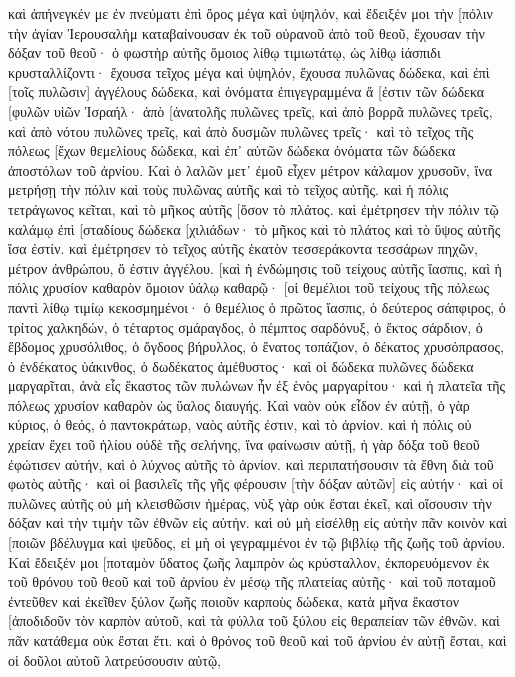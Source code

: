 καὶ ἀπήνεγκέν με ἐν πνεύματι ἐπὶ ὄρος μέγα καὶ ὑψηλόν, καὶ ἔδειξέν μοι τὴν [πόλιν τὴν ἁγίαν Ἰερουσαλὴμ καταβαίνουσαν ἐκ τοῦ οὐρανοῦ ἀπὸ τοῦ θεοῦ, 
ἔχουσαν τὴν δόξαν τοῦ θεοῦ· ὁ φωστὴρ αὐτῆς ὅμοιος λίθῳ τιμιωτάτῳ, ὡς λίθῳ ἰάσπιδι κρυσταλλίζοντι· 
ἔχουσα τεῖχος μέγα καὶ ὑψηλόν, ἔχουσα πυλῶνας δώδεκα, καὶ ἐπὶ [τοῖς πυλῶσιν] ἀγγέλους δώδεκα, καὶ ὀνόματα ἐπιγεγραμμένα ἅ [ἐστιν τῶν δώδεκα [φυλῶν υἱῶν Ἰσραήλ· 
ἀπὸ [ἀνατολῆς πυλῶνες τρεῖς, καὶ ἀπὸ βορρᾶ πυλῶνες τρεῖς, καὶ ἀπὸ νότου πυλῶνες τρεῖς, καὶ ἀπὸ δυσμῶν πυλῶνες τρεῖς· 
καὶ τὸ τεῖχος τῆς πόλεως [ἔχων θεμελίους δώδεκα, καὶ ἐπ᾽ αὐτῶν δώδεκα ὀνόματα τῶν δώδεκα ἀποστόλων τοῦ ἀρνίου. 
Καὶ ὁ λαλῶν μετ᾽ ἐμοῦ εἶχεν μέτρον κάλαμον χρυσοῦν, ἵνα μετρήσῃ τὴν πόλιν καὶ τοὺς πυλῶνας αὐτῆς καὶ τὸ τεῖχος αὐτῆς. 
καὶ ἡ πόλις τετράγωνος κεῖται, καὶ τὸ μῆκος αὐτῆς [ὅσον τὸ πλάτος. καὶ ἐμέτρησεν τὴν πόλιν τῷ καλάμῳ ἐπὶ [σταδίους δώδεκα [χιλιάδων· τὸ μῆκος καὶ τὸ πλάτος καὶ τὸ ὕψος αὐτῆς ἴσα ἐστίν. 
καὶ ἐμέτρησεν τὸ τεῖχος αὐτῆς ἑκατὸν τεσσεράκοντα τεσσάρων πηχῶν, μέτρον ἀνθρώπου, ὅ ἐστιν ἀγγέλου. 
[καὶ ἡ ἐνδώμησις τοῦ τείχους αὐτῆς ἴασπις, καὶ ἡ πόλις χρυσίον καθαρὸν ὅμοιον ὑάλῳ καθαρῷ· 
[οἱ θεμέλιοι τοῦ τείχους τῆς πόλεως παντὶ λίθῳ τιμίῳ κεκοσμημένοι· ὁ θεμέλιος ὁ πρῶτος ἴασπις, ὁ δεύτερος σάπφιρος, ὁ τρίτος χαλκηδών, ὁ τέταρτος σμάραγδος, 
ὁ πέμπτος σαρδόνυξ, ὁ ἕκτος σάρδιον, ὁ ἕβδομος χρυσόλιθος, ὁ ὄγδοος βήρυλλος, ὁ ἔνατος τοπάζιον, ὁ δέκατος χρυσόπρασος, ὁ ἑνδέκατος ὑάκινθος, ὁ δωδέκατος ἀμέθυστος· 
καὶ οἱ δώδεκα πυλῶνες δώδεκα μαργαρῖται, ἀνὰ εἷς ἕκαστος τῶν πυλώνων ἦν ἐξ ἑνὸς μαργαρίτου· καὶ ἡ πλατεῖα τῆς πόλεως χρυσίον καθαρὸν ὡς ὕαλος διαυγής. 
Καὶ ναὸν οὐκ εἶδον ἐν αὐτῇ, ὁ γὰρ κύριος, ὁ θεός, ὁ παντοκράτωρ, ναὸς αὐτῆς ἐστιν, καὶ τὸ ἀρνίον. 
καὶ ἡ πόλις οὐ χρείαν ἔχει τοῦ ἡλίου οὐδὲ τῆς σελήνης, ἵνα φαίνωσιν αὐτῇ, ἡ γὰρ δόξα τοῦ θεοῦ ἐφώτισεν αὐτήν, καὶ ὁ λύχνος αὐτῆς τὸ ἀρνίον. 
καὶ περιπατήσουσιν τὰ ἔθνη διὰ τοῦ φωτὸς αὐτῆς· καὶ οἱ βασιλεῖς τῆς γῆς φέρουσιν [τὴν δόξαν αὐτῶν] εἰς αὐτήν· 
καὶ οἱ πυλῶνες αὐτῆς οὐ μὴ κλεισθῶσιν ἡμέρας, νὺξ γὰρ οὐκ ἔσται ἐκεῖ, 
καὶ οἴσουσιν τὴν δόξαν καὶ τὴν τιμὴν τῶν ἐθνῶν εἰς αὐτήν. 
καὶ οὐ μὴ εἰσέλθῃ εἰς αὐτὴν πᾶν κοινὸν καὶ [ποιῶν βδέλυγμα καὶ ψεῦδος, εἰ μὴ οἱ γεγραμμένοι ἐν τῷ βιβλίῳ τῆς ζωῆς τοῦ ἀρνίου. 
Καὶ ἔδειξέν μοι [ποταμὸν ὕδατος ζωῆς λαμπρὸν ὡς κρύσταλλον, ἐκπορευόμενον ἐκ τοῦ θρόνου τοῦ θεοῦ καὶ τοῦ ἀρνίου 
ἐν μέσῳ τῆς πλατείας αὐτῆς· καὶ τοῦ ποταμοῦ ἐντεῦθεν καὶ ἐκεῖθεν ξύλον ζωῆς ποιοῦν καρποὺς δώδεκα, κατὰ μῆνα ἕκαστον [ἀποδιδοῦν τὸν καρπὸν αὐτοῦ, καὶ τὰ φύλλα τοῦ ξύλου εἰς θεραπείαν τῶν ἐθνῶν. 
καὶ πᾶν κατάθεμα οὐκ ἔσται ἔτι. καὶ ὁ θρόνος τοῦ θεοῦ καὶ τοῦ ἀρνίου ἐν αὐτῇ ἔσται, καὶ οἱ δοῦλοι αὐτοῦ λατρεύσουσιν αὐτῷ, 
